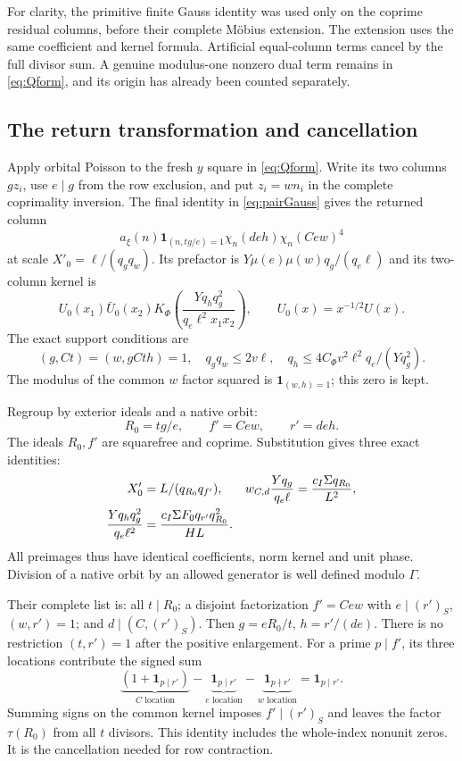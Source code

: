 \documentclass[11pt,a4paper]{article}
\numberwithin{equation}{section}
\theoremstyle{definition}
\theoremstyle{remark}
\newcommand{\ind}{\mathbf1}
\begin{document}
For clarity, the primitive finite Gauss identity was used only on the coprime residual columns, before their complete M\"obius extension. The extension uses the same coefficient and kernel formula. Artificial equal-column terms cancel by the full divisor sum. A genuine modulus-one nonzero dual term remains in \eqref{eq:Qform}, and its origin has already been counted separately.

\subsection{The return transformation and cancellation}
Apply orbital Poisson to the fresh $y$ square in \eqref{eq:Qform}. Write its two columns $gz_i$, use $e\mid g$ from the row exclusion, and put $z_i=wn_i$ in the complete coprimality inversion. The final identity in \eqref{eq:pairGauss} gives the returned column
\begin{equation}\label{eq:returned}
 a_\xi(n)\ind_{(n,tg/e)=1}
           \chi_n(deh)\chi_n(Cew)^4
\end{equation}
at scale $X'_0=\ell/(q_gq_w)$. Its prefactor is
$Y\mu(e)\mu(w)q_g/(q_e\ell)$ and its two-column kernel is
\[
 U_0(x_1)\bar U_0(x_2)
 K_\Phi\left(\frac{Yq_hq_g^2}{q_e\ell^2x_1x_2}\right),
 \qquad U_0(x)=x^{-1/2}U(x).
\]
The exact support conditions are
\[
 (g,Ct)=(w,gCth)=1,\quad
 q_gq_w\le2v\ell,\quad
 q_h\le4C_\Phi v^2\ell^2q_e/(Yq_g^2).
\]
The modulus of the common $w$ factor squared is $\ind_{(w,h)=1}$; this zero is kept.

Regroup by exterior ideals and a native orbit:
\[
 R_0=tg/e,\qquad f'=Cew,\qquad r'=deh.
\]
The ideals $R_0,f'$ are squarefree and coprime. Substitution gives three exact identities:
\begin{align}\label{eq:regroup}
 X'_0&=L/(q_{R_0}q_{f'}),&
 w_{C,d}\frac{Yq_g}{q_e\ell}&=\frac{c_I\Sigma q_{R_0}}{L^2},\notag\\
 \frac{Yq_hq_g^2}{q_e\ell^2}
       &=\frac{c_I\Sigma F_0q_{r'}q_{R_0}^2}{HL}.
\end{align}
All preimages thus have identical coefficients, norm kernel and unit phase. Division of a native orbit by an allowed generator is well defined modulo $\Gamma$.

Their complete list is: all $t\mid R_0$; a disjoint factorization $f'=Cew$ with $e\mid(r')_S$, $(w,r')=1$; and $d\mid(C,(r')_S)$. Then
$g=eR_0/t$, $h=r'/(de)$. There is no restriction $(t,r')=1$ after the positive enlargement. For a prime $p\mid f'$, its three locations contribute the signed sum
\begin{equation}\label{eq:localsigned}
 \underbrace{(1+\ind_{p\mid r'})}_{C\text{ location}}
 -\underbrace{\ind_{p\mid r'}}_{e\text{ location}}
 -\underbrace{\ind_{p\nmid r'}}_{w\text{ location}}
 =\ind_{p\mid r'}.
\end{equation}
Summing signs on the common kernel imposes $f'\mid(r')_S$ and leaves the factor $\tau(R_0)$ from all $t$ divisors. This identity includes the whole-index nonunit zeros. It is the cancellation needed for row contraction.
\end{document}
